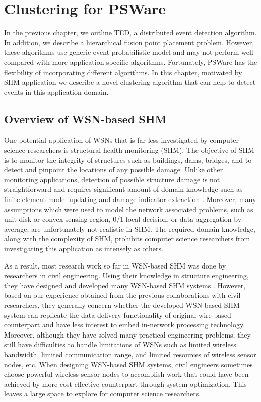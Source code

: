 \chapter{Clustering for PSWare}
\label{chapter:clustering}
In the previous chapter, we outline TED, a distributed event detection algorithm. In addition, we describe a hierarchical fusion point placement problem. However, these algorithms use generic event probabilistic model and may not perform well compared with more application specific algorithms. Fortunately, PSWare has the flexibility of incorporating different algorithms. In this chapter, motivated by SHM application we describe a novel clustering algorithm that can help to detect events in this application domain.

\section{Overview of WSN-based SHM}
One potential application of WSNs that is far less investigated by computer science researchers is structural health monitoring (SHM).  The objective of SHM is to monitor the integrity of structures such as buildings, dams, bridges, and to detect and pinpoint the locations of any possible damage. Unlike other monitoring applications, detection of possible structure damage is not straightforward and requires significant amount of domain knowledge such as finite element model updating and damage indicator extraction \cite{farrar2007introduction}. Moreover, many assumptions which were used to model the network associated problems, such as unit disk or convex sensing region, 0/1 local decision, or data aggregation by average, are unfortunately not realistic in SHM.  The required domain knowledge, along with the complexity of SHM, prohibits computer science researchers from investigating this application as intensely as others.

As a result, most research work so far in WSN-based SHM was done by researchers in civil engineering.  Using their knowledge in structure engineering, they have designed and developed many WSN-based SHM systems \cite{lynch2003embedment}\cite{nagayama2008structural}. However, based on our experience obtained from the previous collaborations with civil researchers, they generally concern whether the developed WSN-based SHM system can replicate the data delivery functionality of original wire-based counterpart and have less interest to embed in-network processing technology. Moreover, although they have solved many practical engineering problems, they still have difficulties to handle limitations of WSNs such as limited wireless bandwidth, limited communication range, and limited resources of wireless sensor nodes, etc.  When designing WSN-based SHM systems, civil engineers sometimes choose powerful wireless sensor nodes to accomplish work that could have been achieved by more cost-effective counterpart through system optimization. This leaves a large space to explore for computer science researchers.

